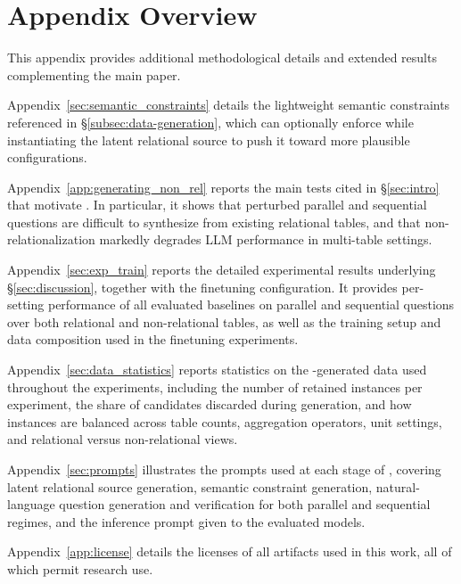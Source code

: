\appendix

\section{Appendix Overview}
\label{sec:appendix}

This appendix provides additional methodological details and extended results complementing the main paper.

Appendix~\ref{sec:semantic_constraints} details the lightweight semantic constraints referenced in \S\ref{subsec:data-generation}, which \name{} can optionally enforce while instantiating the latent relational source to push it toward more plausible configurations.

Appendix~\ref{app:generating_non_rel} reports the main tests cited in \S\ref{sec:intro} that motivate \name{}. In particular, it shows that perturbed parallel and sequential questions are difficult to synthesize from existing relational tables, and that non-relationalization markedly degrades LLM performance in multi-table settings.

Appendix~\ref{sec:exp_train} reports the detailed experimental results underlying \S\ref{sec:discussion}, together with the finetuning configuration. It provides per-setting performance of all evaluated baselines on parallel and sequential questions over both relational and non-relational tables, as well as the training setup and data composition used in the finetuning experiments.

Appendix~\ref{sec:data_statistics} reports statistics on the \name{}-generated data used throughout the experiments, including the number of retained instances per experiment, the share of candidates discarded during generation, and how instances are balanced across table counts, aggregation operators, unit settings, and relational versus non-relational views.

Appendix~\ref{sec:prompts} illustrates the prompts used at each stage of \name{}, covering latent relational source generation, semantic constraint generation, natural-language question generation and verification for both parallel and sequential regimes, and the inference prompt given to the evaluated models.

Appendix~\ref{app:license} details the licenses of all artifacts used in this work, all of which permit research use.

